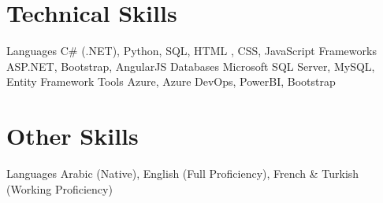 \section{Technical Skills}
\sectionStart
  \skillItem
    {Languages}
    {C\# (.NET), Python, SQL, HTML , CSS, JavaScript}
  \skillItem
    {Frameworks}
    {ASP.NET, Bootstrap, AngularJS}
    \skillItem
    {Databases}
    {Microsoft SQL Server, MySQL, Entity Framework}
  \skillItem
    {Tools}
    {Azure, Azure DevOps, PowerBI, Bootstrap}
    
  \vspace{1pt}
\sectionEnd

\section{Other Skills}
\sectionStart
 \skillItem
    {Languages}
    {Arabic (Native), English (Full Proficiency), French \& Turkish (Working Proficiency)}
\sectionEnd